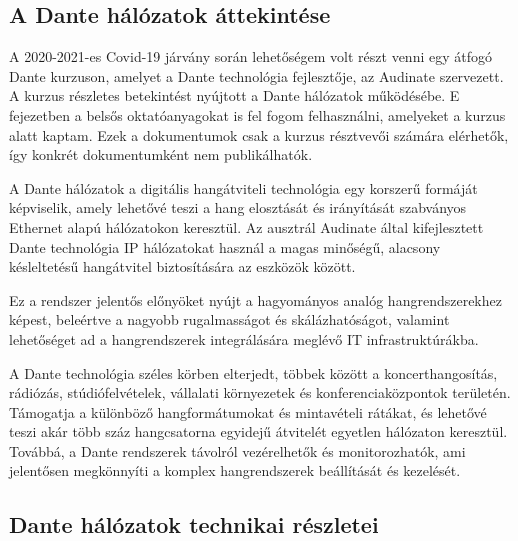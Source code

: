 \subsection{A Dante hálózatok áttekintése}

A 2020-2021-es Covid-19 járvány során lehetőségem volt részt venni egy átfogó Dante
kurzuson, amelyet a Dante technológia fejlesztője, az Audinate szervezett. A kurzus
részletes betekintést nyújtott a Dante hálózatok működésébe. E fejezetben a belsős
oktatóanyagokat is fel fogom felhasználni, amelyeket a kurzus alatt kaptam. Ezek a dokumentumok
csak a kurzus résztvevői számára elérhetők, így konkrét dokumentumként nem publikálhatók. 

A Dante hálózatok a digitális hangátviteli technológia egy korszerű formáját képviselik, 
amely lehetővé teszi a hang elosztását és irányítását szabványos Ethernet alapú hálózatokon 
keresztül. Az ausztrál Audinate által kifejlesztett Dante technológia IP hálózatokat használ 
a magas minőségű, alacsony késleltetésű hangátvitel biztosítására az eszközök között. 

Ez a rendszer jelentős előnyöket nyújt a hagyományos analóg hangrendszerekhez képest, 
beleértve a nagyobb rugalmasságot és skálázhatóságot, valamint lehetőséget ad a hangrendszerek 
integrálására meglévő IT infrastruktúrákba. 

A Dante technológia széles körben elterjedt, többek között a koncerthangosítás, rádiózás, 
stúdiófelvételek, vállalati környezetek és konferenciaközpontok területén. Támogatja a különböző 
hangformátumokat és mintavételi rátákat, és lehetővé teszi akár több száz hangcsatorna egyidejű 
átvitelét egyetlen hálózaton keresztül. Továbbá, a Dante rendszerek távolról vezérelhetők és 
monitorozhatók, ami jelentősen megkönnyíti a komplex hangrendszerek beállítását és kezelését.


\subsection{Dante hálózatok technikai részletei}

